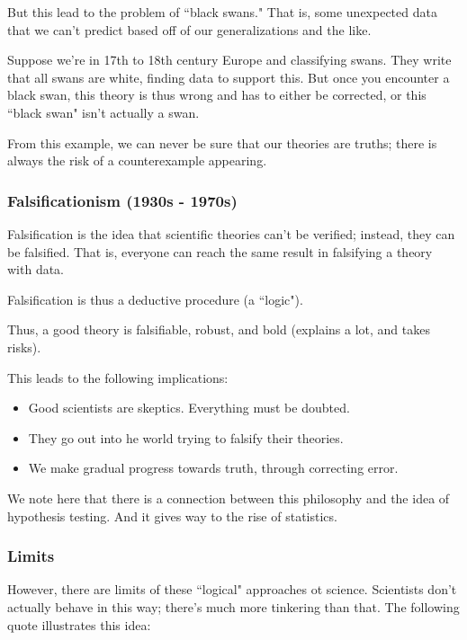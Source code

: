 \documentclass[openany]{book}
\begin{document}
But this lead to the problem of ``black swans." That is, some unexpected data that we can't predict based off of our generalizations and the like.

\begin{example}
	Suppose we're in 17th to 18th century Europe and classifying swans. They write that all swans are white, finding data to support this. But once you encounter a black swan, this theory is thus wrong and has to either be corrected, or this ``black swan" isn't actually a swan.
\end{example}

From this example, we can never be sure that our theories are truths; there is always the risk of a counterexample appearing.

\subsubsection{Falsificationism (1930s - 1970s)}
\begin{defn}
	Falsification is the idea that scientific theories can't be verified; instead, they can be falsified. That is, everyone can reach the same result in falsifying a theory with data.
\end{defn}

Falsification is thus a deductive procedure (a ``logic").

Thus, a good theory is falsifiable, robust, and bold (explains a lot, and takes risks).

This leads to the following implications:
\begin{itemize}
	\item Good scientists are skeptics. Everything must be doubted.
	\item They go out into he world trying to falsify their theories.
	\item We make gradual progress towards truth, through correcting error.
\end{itemize}

\begin{rmk}
	We note here that there is a connection between this philosophy and the idea of hypothesis testing. And it gives way to the rise of statistics.
\end{rmk}

\subsubsection{Limits}
However, there are limits of these ``logical" approaches ot science. Scientists don't actually behave in this way; there's much more tinkering than that. The following quote illustrates this idea:
\end{document}
